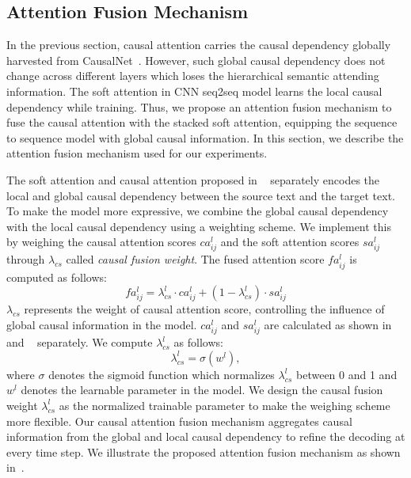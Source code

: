 \subsection{Attention Fusion Mechanism}
\label{sec:fusion}
In the previous section, causal attention
carries the causal dependency globally harvested from CausalNet~\cite{LuoSZHW16}.
However, such global causal dependency does not change across different layers which loses the hierarchical semantic attending information.
The soft attention in CNN seq2seq model learns the 
local causal dependency while training.
Thus, we propose an attention fusion mechanism 
to fuse the causal attention with the stacked soft attention, equipping the sequence to sequence model with global causal information.
In this section, we describe the attention fusion mechanism used for our experiments.


The soft attention and causal attention proposed in ~ separately encodes the local and global causal dependency between the source text and the target text.
To make the model more expressive, 
we combine the global causal dependency with the local causal dependency using a weighting scheme.
We implement this by weighing the causal attention scores
$ca^l_{ij}$ and the soft attention scores $sa^l_{ij}$ through  $\lambda_{cs}$ called \emph{causal fusion weight}.
The fused attention score $fa^l_{ij}$ is computed as follows:
\begin{equation}
\label{eq:fusion}
fa^l_{ij} = \lambda^{l}_{cs} \cdot ca^l_{ij} + (1-\lambda^{l}_{cs}) \cdot sa^l_{ij}
\end{equation}
$\lambda_{cs}$ represents the weight of causal attention score, controlling the influence of global causal information in the model.
$ca^l_{ij}$ and $sa^l_{ij}$ are calculated as shown in
~ and ~ separately.
We compute $\lambda^l_{cs}$ as follows:
\begin{equation}
\label{eq:weight}
\lambda^l_{cs} = \sigma(w^l),
\end{equation}
where $\sigma$ denotes the sigmoid function which 
normalizes $\lambda^l_{cs}$ between 0 and 1
and $w^l$ denotes the learnable parameter in the model.
We design the causal fusion weight $\lambda^l_{cs}$ as the normalized trainable parameter
to make the weighing scheme more flexible.  
Our causal attention fusion mechanism aggregates causal information from the global and local causal dependency to refine the decoding at every time step. 
We illustrate the proposed attention fusion mechanism
as shown in~.

